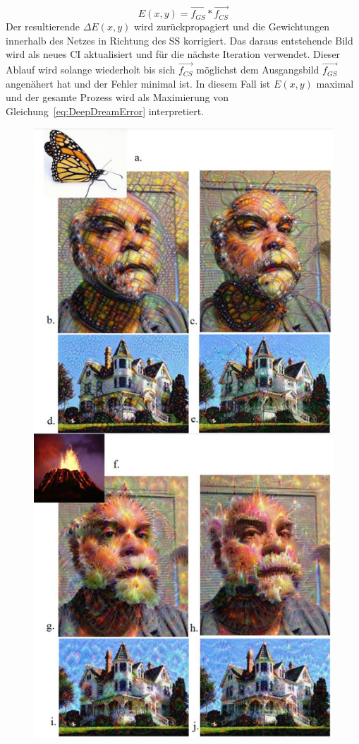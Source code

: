 \documentclass[times, 11pt,twocolumn]{article}
\begin{document}
\footnotesize
\begin{equation}
E(x,y)= \vec{f_{GS}}* \vec{f_{CS}}
\label{eq:DeepDreamError}
\end{equation}
\small
Der resultierende  $\Delta E(x,y)$ wird zurückpropagiert und die Gewichtungen innerhalb des Netzes in Richtung des SS korrigiert. Das daraus entstehende Bild wird als neues CI aktualisiert und für die nächste Iteration verwendet.
Dieser Ablauf wird solange wiederholt bis sich $\vec{f_{CS}}$  möglichst dem Ausgangsbild $\vec{f_{GS}}$ angenähert hat und der Fehler minimal ist. In diesem Fall ist $E(x,y)$ maximal und der gesamte Prozess wird als Maximierung von Gleichung~\ref{eq:DeepDreamError} interpretiert.\\

\begin{figure}
	\flushleft
	\includegraphics[width=\columnwidth]{Bilder/DeepDreamResults.JPG}

\end{figure}
\end{document}
